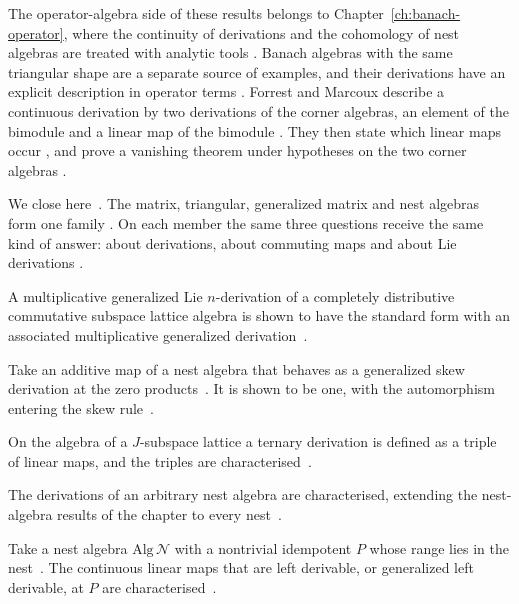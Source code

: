 The operator-algebra side of these results belongs to
Chapter~\ref{ch:banach-operator}, where the continuity of derivations and the
cohomology of nest algebras are treated with analytic tools \cite[Theorem~2.1,
p.~156]{Christensen1977}. Banach algebras with the same triangular shape are a
separate source of examples, and their derivations have an explicit
description in operator terms \cite[Proposition~2.1,
p.~443]{ForrestMarcoux1996}. Forrest and Marcoux describe a continuous
derivation by two derivations of the corner algebras, an element of the
bimodule and a linear map of the bimodule \cite[Proposition~2.1,
p.~443]{ForrestMarcoux1996}. They then state which linear maps occur
\cite[Proposition~2.2, p.~444]{ForrestMarcoux1996}, and prove a vanishing
theorem under hypotheses on the two corner algebras \cite[Theorem~2.8,
p.~448]{ForrestMarcoux1996}.

We close here~\cite[Theorem~11, p.~307]{Cheung2003}. The matrix, triangular, generalized matrix and nest algebras
form one family \cite[p.~2720]{DuWang2012}. On each member the same three
questions receive the same kind of answer: about derivations, about commuting
maps and about Lie derivations \cite[Theorem~11, p.~307]{Cheung2003}.

A multiplicative generalized Lie $n$-derivation of a completely distributive
commutative subspace lattice algebra is shown to have the standard form with
an associated multiplicative generalized
derivation~\cite{WlMultiplicativeGeneralizedL2019}.

Take an additive map of a nest algebra that behaves as a generalized skew
derivation at the zero products~\cite{WlGeneralizedSkewDerivations2011}. It is shown to be one, with the automorphism
entering the skew rule~\cite{WlGeneralizedSkewDerivations2011}.

On the algebra of a $J$-subspace lattice a ternary derivation is defined as a
triple of linear maps, and the triples are
characterised~\cite{WlStructureAndRelatedApplication2019}.

The derivations of an arbitrary nest algebra are characterised, extending the
nest-algebra results of the chapter to every
nest~\cite{WlCharacterizingDerivationsForAn2014}.

Take a nest algebra $\mathrm{Alg}\,\mathcal{N}$ with a nontrivial idempotent
$P$ whose range lies in the nest~\cite{WlLeftDerivableMapsAtNonTrivialI2019}. The continuous linear maps that are left
derivable, or generalized left derivable, at $P$ are
characterised~\cite{WlLeftDerivableMapsAtNonTrivialI2019}.

